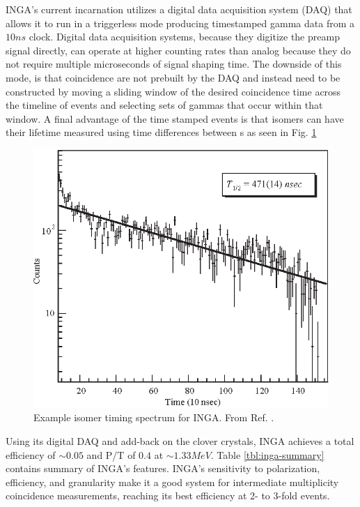 INGA's current incarnation utilizes a digital data acquisition system (DAQ) that allows it to run in a triggerless mode producing timestamped gamma data from a $10ns$ clock\cite{IngaDigitalDAQ}. Digital data acquisition systems, because they digitize the preamp signal directly, can operate at higher counting rates than analog because they do not require multiple microseconds of signal shaping time. The downside of this mode, is that coincidence are not prebuilt by the DAQ and instead need to be constructed by moving a sliding window of the desired coincidence time across the timeline of events and selecting sets of gammas that occur within that window. A final advantage of the time stamped events is that isomers can have their lifetime measured using time differences between \gr{}s as seen in Fig. \ref{fig:chp3-INGA-isomer}

\begin{figure}[h!]
	\centerline{\includegraphics[height=0.35\textheight]{./img/c3/INGA_isomer.eps}}
	\caption{Example isomer timing spectrum for INGA. From Ref. \cite{IngaDigitalDAQ}.}
	\label{fig:chp3-INGA-isomer}
\end{figure}

Using its digital DAQ and add-back on the clover crystals, INGA achieves a total efficiency of $\sim0.05$ and P/T of $0.4$ at $\sim1.33MeV$. Table \ref{tbl:inga-summary} contains summary of INGA's features. INGA's sensitivity to polarization, efficiency, and granularity make it a good system for intermediate \gr{} multiplicity coincidence measurements, reaching its best efficiency at 2- to 3-fold events.

